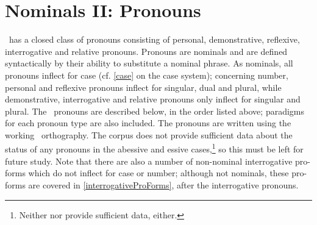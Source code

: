

\chapter{Nominals II: Pronouns}\label{pronouns}
\PS\ has a closed class of pronouns consisting of personal, demonstrative, reflexive, interrogative and relative pronouns. Pronouns are nominals and are defined syntactically by their ability to substitute a nominal phrase. 
As nominals, all pronouns inflect for case (cf. \SEC\ref{case} on the case system); concerning number, personal and reflexive pronouns inflect for singular, dual and plural, while demonstrative, interrogative and relative pronouns only inflect for singular and plural. 
The \PS\ pronouns are described below, in the order listed above; paradigms for each pronoun type are also included. The pronouns are written using the working \PS\ orthography. The corpus does not provide sufficient data about the status of any pronouns in the abessive and essive cases,\footnote{Neither \citet{Lagercrantz1926} nor \citet{Lehtiranta1992} provide sufficient data, either.} 
so this must be left for future study. 
Note that there are also a number of non-nominal interrogative pro-forms which do not inflect for case or number; although not nominals, these pro-forms are covered in \SEC\ref{interrogativeProForms}, after the interrogative pronouns. 



